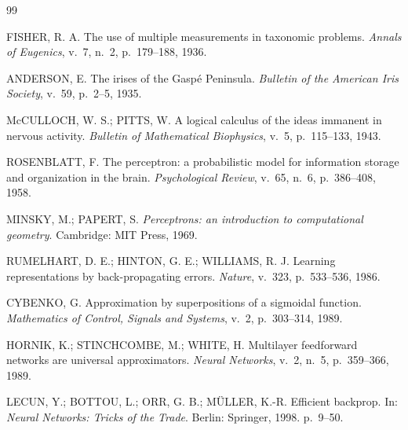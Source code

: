 \documentclass[12pt,a4paper]{article}
\theoremstyle{definition}
\theoremstyle{plain}
\theoremstyle{remark}
\begin{document}
\newpage
\tableofcontents
\newpage
\listoffigures
\listoftables
\newpage











\begin{thebibliography}{99}

FISHER, R. A. The use of multiple measurements in taxonomic problems.
\emph{Annals of Eugenics}, v.~7, n.~2, p.~179--188, 1936.

ANDERSON, E. The irises of the Gaspé Peninsula.
\emph{Bulletin of the American Iris Society}, v.~59, p.~2--5, 1935.

McCULLOCH, W. S.; PITTS, W. A logical calculus of the ideas immanent in nervous activity.
\emph{Bulletin of Mathematical Biophysics}, v.~5, p.~115--133, 1943.

ROSENBLATT, F. The perceptron: a probabilistic model for information storage and organization
in the brain. \emph{Psychological Review}, v.~65, n.~6, p.~386--408, 1958.

MINSKY, M.; PAPERT, S. \emph{Perceptrons: an introduction to computational geometry}.
Cambridge: MIT Press, 1969.

RUMELHART, D. E.; HINTON, G. E.; WILLIAMS, R. J. Learning representations by back-propagating
errors. \emph{Nature}, v.~323, p.~533--536, 1986.

CYBENKO, G. Approximation by superpositions of a sigmoidal function.
\emph{Mathematics of Control, Signals and Systems}, v.~2, p.~303--314, 1989.

HORNIK, K.; STINCHCOMBE, M.; WHITE, H. Multilayer feedforward networks are universal
approximators. \emph{Neural Networks}, v.~2, n.~5, p.~359--366, 1989.

LECUN, Y.; BOTTOU, L.; ORR, G. B.; MÜLLER, K.-R. Efficient backprop.
In: \emph{Neural Networks: Tricks of the Trade}. Berlin: Springer, 1998. p.~9--50.


\end{thebibliography}
\end{document}

